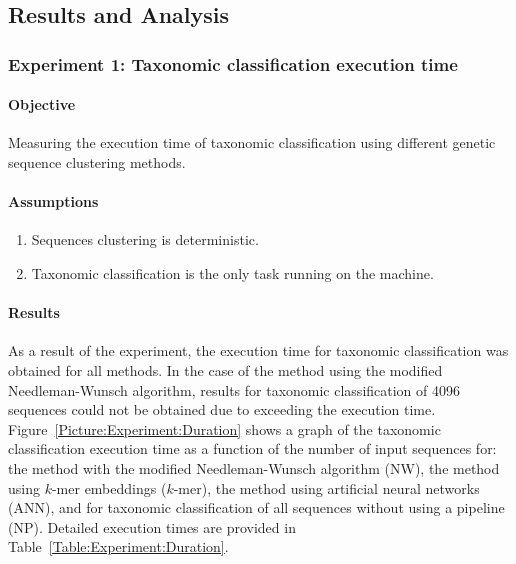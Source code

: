 \documentclass{article}
\begin{document}
        \subsection{Results and Analysis}

            \subsubsection{Experiment 1: Taxonomic classification execution time}

                \paragraph{Objective} 
                Measuring the execution time of taxonomic classification using different genetic sequence clustering methods.

                \paragraph{Assumptions}
                \begin{enumerate}
                    \item {
                        Sequences clustering is deterministic.
                    }
                    \item {
                        Taxonomic classification is the only task running on the machine.
                    }
                \end{enumerate}

                \paragraph{Results}
                As a result of the experiment, the execution time for taxonomic classification was obtained for all methods. In the case of the method using the modified Needleman-Wunsch algorithm, results for taxonomic classification of 4096 sequences could not be obtained due to exceeding the execution time. Figure~\ref{Picture:Experiment:Duration} shows a graph of the taxonomic classification execution time as a function of the number of input sequences for: the method with the modified Needleman-Wunsch algorithm (NW), the method using $k$-mer embeddings ($k$-mer), the method using artificial neural networks (ANN), and for taxonomic classification of all sequences without using a pipeline (NP). Detailed execution times are provided in Table~\ref{Table:Experiment:Duration}.
\end{document}
